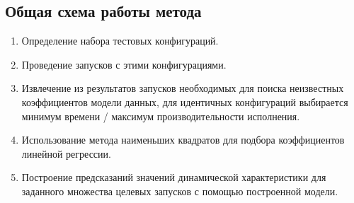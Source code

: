 	\subsection{Общая схема работы метода}
		\begin{enumerate}
		\item Определение набора тестовых конфигураций.
		\item Проведение запусков с этими конфигурациями.
		\item Извлечение из результатов запусков необходимых для поиска неизвестных коэффициентов модели данных, для идентичных конфигураций выбирается минимум времени / максимум производительности исполнения.
		\item Использование метода наименьших квадратов для подбора коэффициентов линейной регрессии.
		\item Построение предсказаний значений динамической характеристики для заданного множества целевых запусков с помощью построенной модели.
		\end{enumerate}
		
\clearpage
